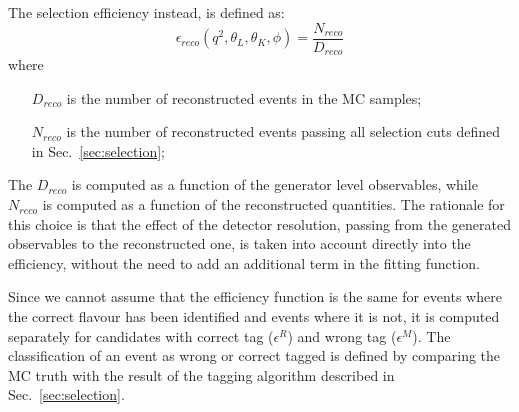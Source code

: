The selection efficiency instead, is defined as:
\begin{equation}\label{eq:effReco}
    \epsilon_{reco}(q^2,\theta_L,\theta_K,\phi)= \frac{N_{reco}}{D_{reco}}
\end{equation}
where
\begin{itemize}
    \item[$D_{reco}$] is the number of reconstructed events in the MC samples;
    \item[$N_{reco}$] is the number of reconstructed events passing all selection cuts defined in Sec.~\ref{sec:selection};
\end{itemize}

The $D_{reco}$ is computed as a function of the generator level observables, while $N_{reco}$ is computed as a function of the reconstructed quantities.
The rationale for this choice is that the effect of the detector resolution, passing from the generated observables to the reconstructed one, is taken into account directly into the efficiency, without the need to add an additional term in the fitting function.

Since we cannot assume that the efficiency function is the same for events where the correct flavour has been identified and events where it is not, it is computed separately for candidates with correct tag ($\epsilon^R$) and wrong tag ($\epsilon^M$).
The classification of an event as wrong or correct tagged is defined by comparing the MC truth with the result of the tagging algorithm described in Sec.~\ref{sec:selection}.



